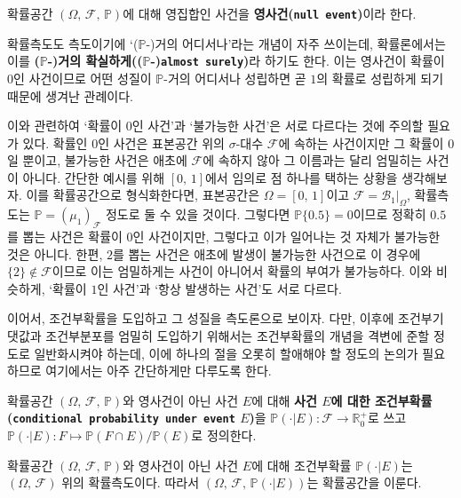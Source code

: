 \begin{definition}
    확률공간 $(\Omega,\,\mathcal{F},\,\mathbb{P})$에 대해 영집합인 사건을 \textbf{영사건(\texttt{null event})}이라 한다.
\end{definition}

확률측도도 측도이기에 `($\mathbb{P}$-)거의 어디서나'라는 개념이 자주 쓰이는데, 확률론에서는 이를 \textbf{($\mathbb{P}$-)거의 확실하게(($\mathbb{P}$-)\texttt{almost surely})}라 하기도 한다. 이는 영사건이 확률이 $0$인 사건이므로 어떤 성질이 $\mathbb{P}$-거의 어디서나 성립하면 곧 $1$의 확률로 성립하게 되기 때문에 생겨난 관례이다.

이와 관련하여 `확률이 $0$인 사건'과 `불가능한 사건'은 서로 다르다는 것에 주의할 필요가 있다. 확률인 $0$인 사건은 표본공간 위의 $\sigma$-대수 $\mathcal{F}$에 속하는 사건이지만 그 확률이 $0$일 뿐이고, 불가능한 사건은 애초에 $\mathcal{F}$에 속하지 않아 그 이름과는 달리 엄밀히는 사건이 아니다. 간단한 예시를 위해 $[0,\,1]$에서 임의로 점 하나를 택하는 상황을 생각해보자. 이를 확률공간으로 형식화한다면, 표본공간은 $\Omega=[0,\,1]$이고 $\mathcal{F}=\mathcal{B}_1\vert_\Omega$, 확률측도는 $\mathbb{P}=(\mu_1)_\mathcal{F}$ 정도로 둘 수 있을 것이다. 그렇다면 $\mathbb{P}\{0.5\}=0$이므로 정확히 $0.5$를 뽑는 사건은 확률이 $0$인 사건이지만, 그렇다고 이가 일어나는 것 자체가 불가능한 것은 아니다. 한편, $2$를 뽑는 사건은 애초에 발생이 불가능한 사건으로 이 경우에 $\{2\}\notin\mathcal{F}$이므로 이는 엄밀하게는 사건이 아니어서 확률의 부여가 불가능하다. 이와 비슷하게, `확률이 $1$인 사건'과 `항상 발생하는 사건'도 서로 다르다.

이어서, 조건부확률을 도입하고 그 성질을 측도론으로 보이자. 다만, 이후에 조건부기댓값과 조건부분포를 엄밀히 도입하기 위해서는 조건부확률의 개념을 격변에 준할 정도로 일반화시켜야 하는데, 이에 하나의 절을 오롯히 할애해야 할 정도의 논의가 필요하므로 여기에서는 아주 간단하게만 다루도록 한다.

\begin{definition}
    확률공간 $(\Omega,\,\mathcal{F},\,\mathbb{P})$와 영사건이 아닌 사건 $E$에 대해 \textbf{사건 $E$에 대한 조건부확률(\texttt{conditional probability under event} $E$)}을  $\mathbb{P}(\cdot\vert E):\mathcal{F}\to\mathbb{R}^+_0$로 쓰고 $\mathbb{P}(\cdot\vert E):F\mapsto\mathbb{P}(F\cap E)/\mathbb{P}(E)$로 정의한다.
\end{definition}

\begin{proposition}
    확률공간 $(\Omega,\,\mathcal{F},\,\mathbb{P})$와 영사건이 아닌 사건 $E$에 대해 조건부확률 $\mathbb{P}(\cdot\vert E)$는 $(\Omega,\,\mathcal{F})$ 위의 확률측도이다. 따라서 $(\Omega,\,\mathcal{F},\,\mathbb{P}(\cdot\vert E))$는 확률공간을 이룬다.
\end{proposition}

